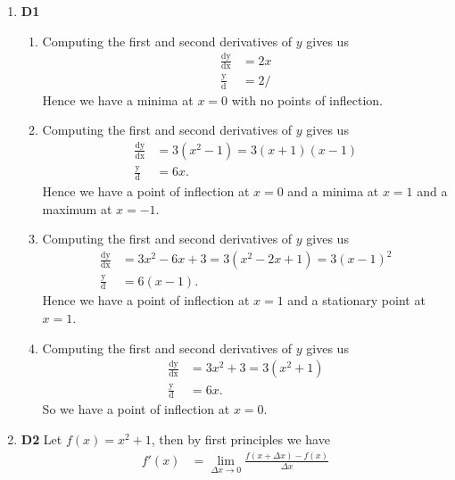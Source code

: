\documentclass[12pt,oneside]{book}
\begin{document}
\begin{enumerate}
        \item \textbf{D1} \begin{enumerate}
            \item Computing the first and second derivatives of $y$ gives us \begin{align*}
                \frac{\mathop{\mathrm{d}y}}{\mathop{\mathrm{d}x}} &= 2x \\
                \frac{\mathop{\mathrm{d}^{2}y}}{\mathop{\mathrm{d}x^{2}}} &= 2/
            \end{align*} Hence we have a minima at $x = 0$ with no points of inflection.
            \item Computing the first and second derivatives of $y$ gives us \begin{align*}
                \frac{\mathop{\mathrm{d}y}}{\mathop{\mathrm{d}x}} &= 3(x^2 - 1) = 3(x+1)(x-1) \\
                \frac{\mathop{\mathrm{d}^{2}y}}{\mathop{\mathrm{d}x^{2}}} &= 6x.
            \end{align*} Hence we have a point of inflection at $x = 0$ and a minima at $x = 1$ and a maximum at $x=-1$.
            \item Computing the first and second derivatives of $y$ gives us \begin{align*}
                \frac{\mathop{\mathrm{d}y}}{\mathop{\mathrm{d}x}} &= 3x^2 - 6x + 3 = 3(x^2 - 2x + 1) = 3(x - 1)^2 \\
                \frac{\mathop{\mathrm{d}^{2}y}}{\mathop{\mathrm{d}x^{2}}}  &= 6(x - 1).
            \end{align*}
            Hence we have a point of inflection at $x = 1$ and a stationary point at $x = 1$.
            \item Computing the first and second derivatives of $y$ gives us \begin{align*}
                \frac{\mathop{\mathrm{d}y}}{\mathop{\mathrm{d}x}} &= 3x^2 + 3 = 3(x^2+1) \\
                \frac{\mathop{\mathrm{d}^{2}y}}{\mathop{\mathrm{d}x^{2}}} &= 6x.
            \end{align*} So we have a point of inflection at $x = 0$. 
        \end{enumerate}
        \item \textbf{D2} Let $f(x) = x^2 + 1$, then by first principles we have \begin{align*}
            f'(x) &= \lim_{\Delta x \to 0} \frac{f(x + \Delta x) - f(x)}{\Delta x} \\ 

\end{align*}
\end{enumerate}
\end{document}
